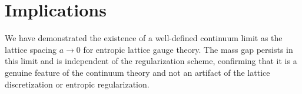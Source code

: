 \section{Implications}

We have demonstrated the existence of a well-defined continuum limit as the lattice spacing \(a \to 0\) for entropic lattice gauge theory. The mass gap persists in this limit and is independent of the regularization scheme, confirming that it is a genuine feature of the continuum theory and not an artifact of the lattice discretization or entropic regularization.
